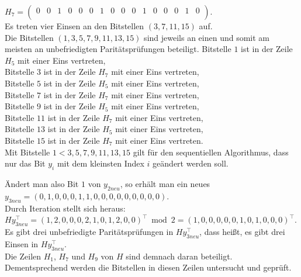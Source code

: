 \begin{Beispiel}
    $H_7= \left( \begin{array}{rrrrrrrrrrrrrrrr}
        0 & 0 & 1 & 0 & 0 & 0 & 1 & 0 & 0 & 0 & 1 & 0 & 0 & 0 & 1 & 0 \\
       \end{array}\right). 
    $\\
    Es treten vier Einsen an den Bitstellen $(3, 7, 11, 15)$ auf.\\
    
    Die Bitstellen $(1, 3, 5, 7, 9, 11, 13, 15)$ sind jeweils an einen und somit am meisten an unbefriedigten Paritätsprüfungen beteiligt.
    Bitstelle $1$ ist in der Zeile $H_5$ mit einer Eins vertreten,\\
    Bitstelle $3$ ist in der Zeile $H_7$ mit einer Eins vertreten,\\
    Bitstelle $5$ ist in der Zeile $H_5$ mit einer Eins vertreten,\\
    Bitstelle $7$ ist in der Zeile $H_7$ mit einer Eins vertreten,\\
    Bitstelle $9$ ist in der Zeile $H_5$ mit einer Eins vertreten,\\
    Bitstelle $11$ ist in der Zeile $H_7$ mit einer Eins vertreten,\\
    Bitstelle $13$ ist in der Zeile $H_5$ mit einer Eins vertreten,\\
    Bitstelle $15$ ist in der Zeile $H_7$ mit einer Eins vertreten.\\
    Mit Bitstelle $1 < 3, 5, 7, 9, 11, 13, 15$ gilt für den sequentiellen Algorithmus, dass nur das Bit $y_i$ mit dem kleinsten Index $i$ geändert werden soll.\\
    \pagebreak

    Ändert man also Bit $1$ von $y_{2neu}$, so erhält man ein neues\\
    $y_{3neu} = (0,1,0,0,0,1,1,0,0,0,0,0,0,0,0,0).$\\
    
    Durch Iteration stellt sich heraus:\\
    $Hy_{3neu}^\intercal= (1,2,0,0,0,2,1,0,1,2,0,0)^\intercal \bmod 2= (1,0,0,0,0,0,1,0,1,0,0,0)^\intercal.$\\
    
    Es gibt drei unbefriedigte Paritätsprüfungen in $Hy_{3neu}^\intercal$, 
    dass hei\ss{}t, es gibt drei Einsen in $Hy_{3neu}^\intercal.$\\
    Die Zeilen $H_1$, $H_7$ und $H_9$ von $H$ sind demnach daran beteiligt.\\ 
    Dementsprechend werden die Bitstellen in diesen Zeilen untersucht und geprüft.\\
    

\end{Beispiel}
